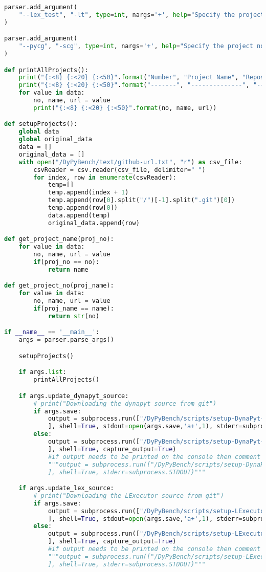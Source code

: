 \begin{lstlisting}[caption=Access Interface of DyPyBench,label=code:dypybench.py,language=Python]
parser.add_argument(
    "--lex_test", "-lt", type=int, nargs='+', help="Specify the project no. to run test suite for LExecutor"
)

parser.add_argument(
    "--pycg", "-scg", type=int, nargs='+', help="Specify the project no. to run PyCG for static call graph generation"
)

def printAllProjects():
    print("{:<8} {:<20} {:<50}".format("Number", "Project Name", "Repository URL"))
    print("{:<8} {:<20} {:<50}".format("-------", "--------------", "---------------------------------"))
    for value in data:
        no, name, url = value
        print("{:<8} {:<20} {:<50}".format(no, name, url))

def setupProjects():
    global data
    global original_data
    data = []
    original_data = []
    with open("/DyPyBench/text/github-url.txt", "r") as csv_file:
        csvReader = csv.reader(csv_file, delimiter=" ")
        for index, row in enumerate(csvReader):
            temp=[]
            temp.append(index + 1)
            temp.append(row[0].split("/")[-1].split(".git")[0])
            temp.append(row[0])
            data.append(temp)
            original_data.append(row)

def get_project_name(proj_no):
    for value in data:
        no, name, url = value
        if(proj_no == no):
            return name

def get_project_no(proj_name):
    for value in data:
        no, name, url = value
        if(proj_name == name):
            return str(no)

if __name__ == '__main__':
    args = parser.parse_args()

    setupProjects()

    if args.list:
        printAllProjects()

    if args.update_dynapyt_source:
        # print("Downloading the dynapyt source from git")
        if args.save:
            output = subprocess.run(["/DyPyBench/scripts/setup-DynaPyt-src.sh"
            ], shell=True, stdout=open(args.save,'a+',1), stderr=subprocess.STDOUT)
        else:
            output = subprocess.run(["/DyPyBench/scripts/setup-DynaPyt-src.sh"
            ], shell=True, capture_output=True)
            #if output needs to be printed on the console then comment above and uncomment below
            """output = subprocess.run(["/DyPyBench/scripts/setup-DynaPyt-src.sh"
            ], shell=True, stderr=subprocess.STDOUT)"""

    if args.update_lex_source:
        # print("Downloading the LExecutor source from git")
        if args.save:
            output = subprocess.run(["/DyPyBench/scripts/setup-LExecutor-src.sh"
            ], shell=True, stdout=open(args.save,'a+',1), stderr=subprocess.STDOUT)
        else:
            output = subprocess.run(["/DyPyBench/scripts/setup-LExecutor-src.sh"
            ], shell=True, capture_output=True)
            #if output needs to be printed on the console then comment above and uncomment below
            """output = subprocess.run(["/DyPyBench/scripts/setup-LExecutor-src.sh"
            ], shell=True, stderr=subprocess.STDOUT)"""


\end{lstlisting}
